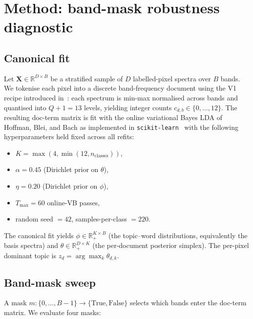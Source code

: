 \documentclass[conference,a4paper,10pt]{IEEEtran}
\begin{document}
\section{Method: band-mask robustness diagnostic}
\label{sec:method}

\subsection{Canonical fit}

Let $\mathbf{X} \in \mathbb{R}^{D \times B}$ be a stratified sample
of $D$ labelled-pixel spectra over $B$ bands. We tokenise each pixel
into a discrete band-frequency document using the V1 recipe
introduced in~\cite{santibanezleal2022procemin}: each spectrum is
min-max normalised across bands and quantised into $Q+1 = 13$ levels,
yielding integer counts $c_{d,b} \in \{0, \ldots, 12\}$. The
resulting doc-term matrix is fit with the online variational Bayes
LDA of Hoffman, Blei, and Bach \cite{hoffman2010online} as
implemented in \texttt{scikit-learn}~\cite{pedregosa2011scikit} with
the following hyperparameters held fixed across all refits:

\begin{itemize}
\item $K = \max(4, \min(12, n_{\text{classes}}))$,
\item $\alpha = 0.45$ (Dirichlet prior on $\theta$),
\item $\eta = 0.20$ (Dirichlet prior on $\phi$),
\item $T_{\max} = 60$ online-VB passes,
\item random seed $= 42$, samples-per-class $= 220$.
\end{itemize}

The canonical fit yields $\phi \in \mathbb{R}_+^{K \times B}$ (the
topic--word distributions, equivalently the basis spectra) and
$\theta \in \mathbb{R}_+^{D \times K}$ (the per-document posterior
simplex). The per-pixel dominant topic is
$z_d = \arg\max_k \theta_{d,k}$.

\subsection{Band-mask sweep}

A mask $m : \{0, \ldots, B-1\} \to \{\text{True}, \text{False}\}$
selects which bands enter the doc-term matrix. We evaluate four
masks:
\end{document}
